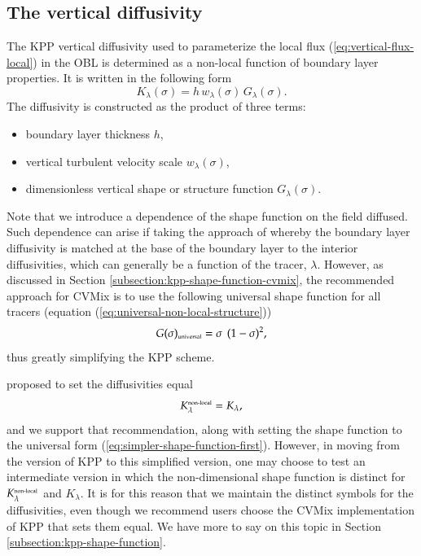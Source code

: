 \subsection{The vertical diffusivity}
\label{subsection:kpp-vertical-diffusivity}

The KPP vertical diffusivity used to parameterize the local flux
(\ref{eq:vertical-flux-local}) in the OBL is determined as a non-local
function of boundary layer properties. It is written in the following
form
\begin{equation}
  K_{\lambda}(\sigma) = h \, w_{\lambda}(\sigma) \, G_{\lambda}(\sigma).
\label{eq:kpp-diffusivity}
\end{equation}
The diffusivity is constructed as the product of three terms:
\begin{itemize}
 \item boundary layer thickness $h$,
 \item vertical turbulent velocity scale $w_{\lambda}(\sigma)$, 
 \item dimensionless vertical shape or structure function
   $G_{\lambda}(\sigma)$. 
\end{itemize}
Note that we introduce a dependence of the shape function on the field
diffused.  Such dependence can arise if taking the approach of
\cite{LargeKPP} whereby the boundary layer diffusivity is matched at
the base of the boundary layer to the interior diffusivities, which
can generally be a function of the tracer, $\lambda$.  However, as
discussed in Section \ref{subsection:kpp-shape-function-cvmix}, the
recommended approach for CVMix is to use the following universal shape
function for all tracers (equation
(\ref{eq:universal-non-local-structure}))
\begin{equation}
 G(\sigma)_{\mbox{\tiny universal}} = \sigma \, \ (1-\sigma)^{2},
\label{eq:simpler-shape-function-first}
\end{equation}
 thus greatly simplifying the KPP scheme. 

\cite{LargeKPP} proposed to set the diffusivities equal
\begin{equation}
 K^{\mbox{\tiny non-local}}_{\lambda} = K_{\lambda},
\end{equation}
and we support that recommendation, along with setting the shape
function to the universal form
(\ref{eq:simpler-shape-function-first}).  However, in moving from the
\cite{LargeKPP} version of KPP to this simplified version, one may
choose to test an intermediate version in which the non-dimensional
shape function is distinct for $K^{\mbox{\tiny non-local}}_{\lambda}$
and $K_{\lambda}$.  It is for this reason that we maintain the
distinct symbols for the diffusivities, even though we recommend users
choose the CVMix implementation of KPP that sets them equal.  We have
more to say on this topic in Section
\ref{subsection:kpp-shape-function}.


